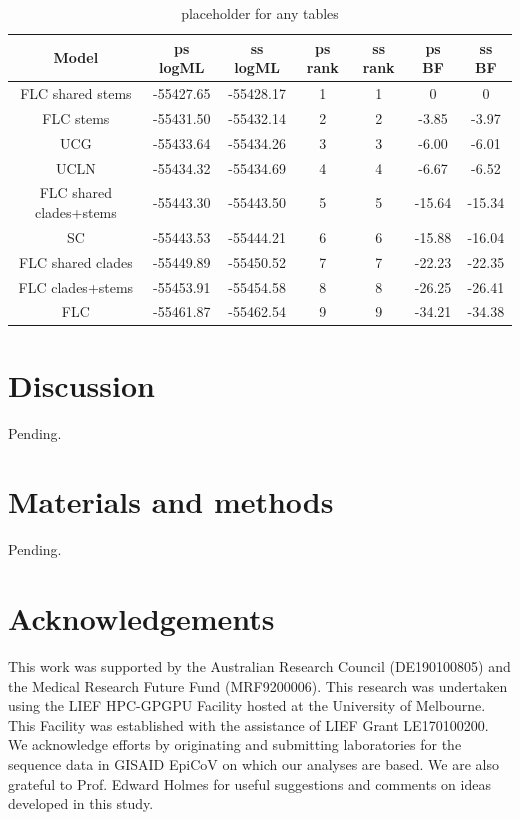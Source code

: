 \documentclass[11pt]{article}
\begin{document}
	

\begin{table}[H]
	\begin{center}
		\caption{placeholder for any tables}
		\label{table:table2}
		\begin{tabular}{c|c|c|c|c|c|c}
			\textbf{Model} & \textbf{ps logML} & \textbf{ss logML} & \textbf{ps rank} & \textbf{ss rank} & \textbf{ps BF} & \textbf{ss BF} \\ 
			\hline
		FLC shared stems & -55427.65 & -55428.17 & 1 & 1 & 0 & 0 \\ 
		FLC stems & -55431.50 & -55432.14 & 2 & 2 & -3.85 & -3.97 \\
		UCG	&	-55433.64 & -55434.26 & 3 & 3 & -6.00 & -6.01 \\
		UCLN & -55434.32 & -55434.69 & 4 & 4 & -6.67 & -6.52 \\ 
		FLC shared clades+stems & -55443.30 & -55443.50 & 5 & 5 & -15.64 & -15.34 \\ 
		SC & -55443.53 & -55444.21 & 6 & 6 & -15.88 & -16.04\\ 
		FLC shared clades & -55449.89 & -55450.52 & 7 & 7 & -22.23 & -22.35 \\ 
		FLC clades+stems & -55453.91 & -55454.58 & 8 & 8 & -26.25 & -26.41 \\ 
		FLC & -55461.87 & -55462.54 & 9 & 9 & -34.21 & -34.38 \\ 
		\end{tabular}
	\end{center}
\end{table}





\section{Discussion}
Pending.
\section{Materials and methods}
Pending.


\section{Acknowledgements}
This work was supported by the Australian Research Council (DE190100805) and the Medical Research Future Fund (MRF9200006). This research was undertaken using the LIEF HPC-GPGPU Facility hosted at the University of Melbourne. This Facility was established with the assistance of LIEF Grant LE170100200. We acknowledge efforts by originating and submitting laboratories for the sequence data in GISAID EpiCoV on which our analyses are based. We are also grateful to Prof. Edward Holmes for useful suggestions and comments on ideas developed in this study.



%

\end{document}
